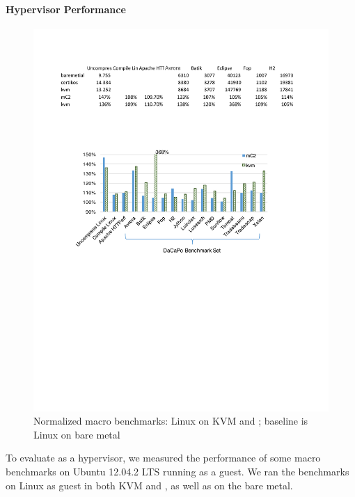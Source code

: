 \paragraph{Hypervisor Performance} 
\begin{figure}\centering
		\hspace{-.2cm}
		\includegraphics[width=13cm]{figs/hyp_macro.pdf}
		\hspace{-.2cm}
		\caption{Normalized macro benchmarks: Linux on KVM and \cCTOS; baseline is Linux on bare metal}
		\label{fig:eval_macro}
		\hrulefill
\end{figure}

To evaluate \cCTOS{} as a hypervisor, we measured the performance of some
macro benchmarks on Ubuntu 12.04.2 LTS running as a guest.  We ran the
benchmarks on Linux as guest in both KVM and \cCTOS{}, as well as on the bare
metal. 

